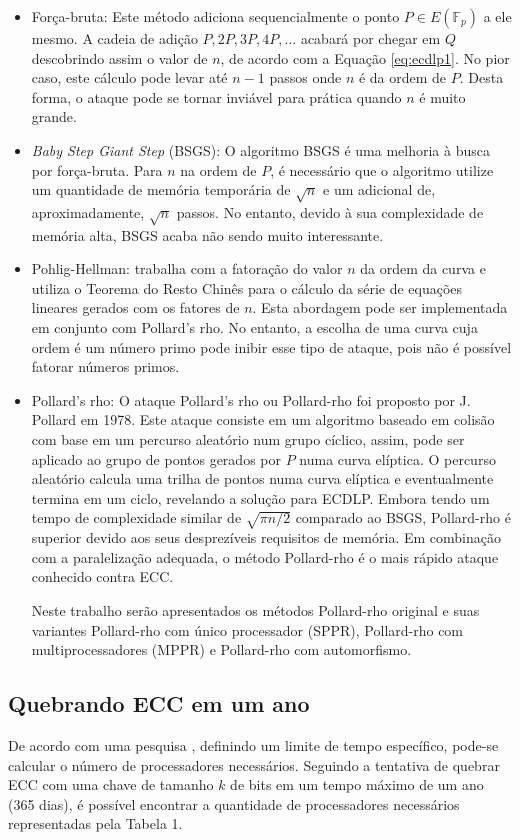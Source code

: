 \begin{itemize}
\item Força-bruta: Este método adiciona sequencialmente o ponto $P \in E(\mathbb{F}_p)$ a ele mesmo. A cadeia de adição $P, 2P, 3P, 4P, ...$ acabará por chegar em \(Q\) descobrindo assim o valor de \(n\), de acordo com a Equação \ref{eq:ecdlp1}. No pior caso, este cálculo pode levar até $n - 1$ passos onde \(n\) é da ordem de \(P\). Desta forma, o ataque pode se tornar inviável para prática quando \(n\) é muito grande.
\item \textit{Baby Step Giant Step} (BSGS): O algoritmo BSGS é uma melhoria à busca por força-bruta. Para \(n\) na ordem de \(P\), é necessário que o algoritmo utilize um quantidade de memória temporária de $\sqrt{n}$ e um adicional de, aproximadamente, $\sqrt{n}$ passos. No entanto, devido à sua complexidade de memória alta, BSGS acaba não sendo muito interessante.
\item Pohlig-Hellman: trabalha com a fatoração do valor \(n\) da ordem da curva e utiliza o Teorema do Resto Chinês para o cálculo da série de equações lineares gerados com os fatores de \(n\). Esta abordagem pode ser implementada em conjunto com Pollard's rho. No entanto, a escolha de uma curva cuja ordem é um número primo pode inibir esse tipo de ataque, pois não é possível fatorar números primos.
\item Pollard's rho: O ataque Pollard's rho ou Pollard-rho foi proposto por J. Pollard em 1978. Este ataque consiste em um algoritmo baseado em colisão com base em um percurso aleatório num grupo cíclico, assim, pode ser aplicado ao grupo de pontos gerados por \(P\) numa curva elíptica. O percurso aleatório calcula uma trilha de pontos numa curva elíptica e eventualmente termina em um ciclo, revelando a solução para ECDLP. \cite{Pollard:1978} Embora tendo um tempo de complexidade similar de $\sqrt{\pi n/2}$ comparado ao BSGS, Pollard-rho é superior devido aos seus desprezíveis requisitos de memória. Em combinação com a paralelização adequada, o método Pollard-rho é o mais rápido ataque conhecido contra ECC. \cite{Pelzl:2006}

Neste trabalho serão apresentados os métodos Pollard-rho original e suas variantes Pollard-rho com único processador (SPPR), Pollard-rho com multiprocessadores (MPPR) e Pollard-rho com automorfismo.
\end{itemize}

%
%
\subsection{Quebrando ECC em um ano}
De acordo com uma pesquisa \cite{Pelzl:2006}, definindo um limite de tempo específico, pode-se calcular o número de processadores necessários. Seguindo a tentativa de quebrar ECC com uma chave de tamanho \(k\) de bits em um tempo máximo de um ano (365 dias), é possível encontrar a quantidade de processadores necessários representadas pela Tabela 1.

